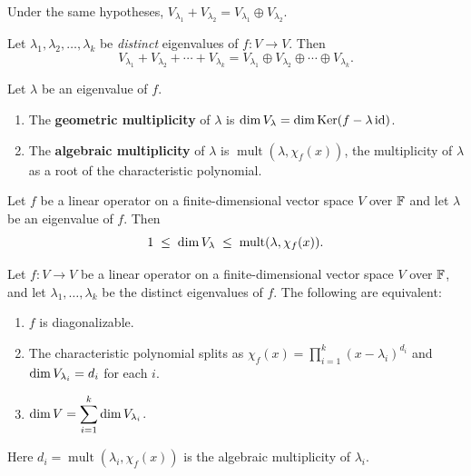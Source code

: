 \begin{corbox}
Under the same hypotheses, $V_{\lambda_1}+V_{\lambda_2}=V_{\lambda_1}\oplus V_{\lambda_2}$.
\end{corbox}

\begin{thmbox}
\label{thm:eigenspaces-direct}
Let $\lambda_1,\lambda_2,\ldots,\lambda_k$ be \emph{distinct} eigenvalues
of $f:V\to V$.  Then
\[
    V_{\lambda_1}+V_{\lambda_2}+\cdots+V_{\lambda_k}
    = V_{\lambda_1}\oplus V_{\lambda_2}\oplus\cdots\oplus V_{\lambda_k}.
\]
\end{thmbox}

\begin{defbox}
\label{def:multiplicities}
Let $\lambda$ be an eigenvalue of $f$.
\begin{enumerate}[label=\textbf{(\alph*)}]
    \item The \textbf{geometric multiplicity} of $\lambda$ is
          $\operatorname{dim} V_\lambda = \operatorname{dim}\operatorname{Ker}(f-\lambda\,\mathrm{id})$.
    \item The \textbf{algebraic multiplicity} of $\lambda$ is
          $\operatorname{mult}(\lambda,\chi_f(x))$, the multiplicity
          of $\lambda$ as a root of the characteristic polynomial.
\end{enumerate}
\end{defbox}

\begin{propbox}
\label{prop:mult-inequality}
Let $f$ be a linear operator on a finite-dimensional vector space $V$ over
$\mathbb{F}$ and let $\lambda$ be an eigenvalue of $f$.  Then
\[
    1 \;\le\; \operatorname{dim} V_\lambda \;\le\; \operatorname{mult}(\lambda,\chi_f(x)).
\]
\end{propbox}

\begin{thmbox}
\label{thm:diag-equiv}
Let $f:V\to V$ be a linear operator on a finite-dimensional vector space
$V$ over $\mathbb{F}$, and let $\lambda_1,\ldots,\lambda_k$ be the distinct
eigenvalues of $f$.  The following are equivalent:
\begin{enumerate}[label=\textbf{(\roman*)}]
    \item $f$ is diagonalizable.
    \item The characteristic polynomial splits as
          $\chi_f(x)=\prod_{i=1}^k(x-\lambda_i)^{d_i}$ and
          $\operatorname{dim} V_{\lambda_i}=d_i$ for each $i$.
    \item $\displaystyle\operatorname{dim} V = \sum_{i=1}^k \operatorname{dim} V_{\lambda_i}$.
\end{enumerate}
Here $d_i=\operatorname{mult}(\lambda_i,\chi_f(x))$ is the algebraic
multiplicity of $\lambda_i$.
\end{thmbox}

